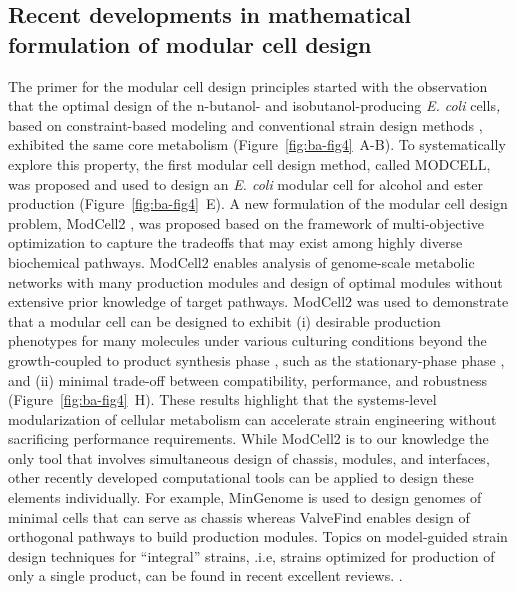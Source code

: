 \subsection{Recent developments in mathematical formulation of modular cell design}


The primer for the modular cell design principles started with the observation \citep{trinh2012} that the optimal design of the n-butanol- and isobutanol-producing \emph{E.
coli} cells\emph{,} based on constraint-based modeling \citep{palsson2015} and conventional strain design methods \citep{trinh2009}, exhibited the same core metabolism (Figure~\ref{fig:ba-fig4}~A-B).
To systematically explore this property, the first modular cell design method, called MODCELL, was proposed and used to design an \emph{E.
coli} modular cell for alcohol and ester production \citep{trinh2015} (Figure~\ref{fig:ba-fig4}~E).
A new formulation of the modular cell design problem, ModCell2 \citep{garcia2019}, was proposed based on the framework of multi-objective optimization to capture the tradeoffs that may exist among highly diverse biochemical pathways.
ModCell2 enables analysis of genome-scale metabolic networks with many production modules and design of optimal modules without extensive prior knowledge of target pathways.
ModCell2 was used to demonstrate that a modular cell can be designed to exhibit (i) desirable production phenotypes for many molecules under various culturing conditions beyond the growth-coupled to product synthesis phase \citep{klamt2015}, such as the stationary-phase phase \citep{klamt2018}, and (ii) minimal trade-off between compatibility, performance, and robustness (Figure~\ref{fig:ba-fig4}~H).
These results highlight that the systems-level modularization of cellular metabolism can accelerate strain engineering without sacrificing performance requirements.
While ModCell2 is to our knowledge the only tool that involves simultaneous design of chassis, modules, and interfaces, other recently developed computational tools can be applied to design these elements individually.
For example, MinGenome \citep{wang2018} is used to design genomes of minimal cells that can serve as chassis whereas ValveFind \citep{pandit2017} enables design of orthogonal pathways to build production modules.
Topics on model-guided strain design techniques for ``integral'' strains, .i.e, strains optimized for production of only a single product, can be found in recent excellent reviews.
\citep{long2015, machado2015, ng2015}.

